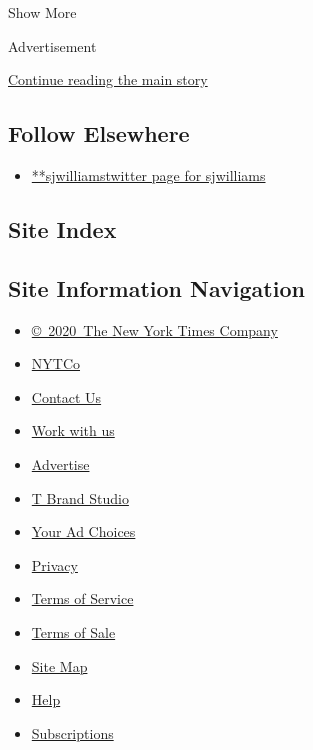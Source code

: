Show More

Advertisement

\protect\hyperlink{after-mid2}{Continue reading the main story}

\hypertarget{follow-elsewhere}{%
\subsection{Follow Elsewhere}\label{follow-elsewhere}}

\begin{itemize}
\tightlist
\item
  \href{https://twitter.com/sjwilliams}{**sjwilliamstwitter page for
  sjwilliams}
\end{itemize}

\hypertarget{site-index}{%
\subsection{Site Index}\label{site-index}}

\hypertarget{site-information-navigation}{%
\subsection{Site Information
Navigation}\label{site-information-navigation}}

\begin{itemize}
\tightlist
\item
  \href{https://help.nytimes.com/hc/en-us/articles/115014792127-Copyright-notice}{©~2020~The
  New York Times Company}
\end{itemize}

\begin{itemize}
\tightlist
\item
  \href{https://www.nytco.com/}{NYTCo}
\item
  \href{https://help.nytimes.com/hc/en-us/articles/115015385887-Contact-Us}{Contact
  Us}
\item
  \href{https://www.nytco.com/careers/}{Work with us}
\item
  \href{https://nytmediakit.com/}{Advertise}
\item
  \href{http://www.tbrandstudio.com/}{T Brand Studio}
\item
  \href{https://www.nytimes.com/privacy/cookie-policy\#how-do-i-manage-trackers}{Your
  Ad Choices}
\item
  \href{https://www.nytimes.com/privacy}{Privacy}
\item
  \href{https://help.nytimes.com/hc/en-us/articles/115014893428-Terms-of-service}{Terms
  of Service}
\item
  \href{https://help.nytimes.com/hc/en-us/articles/115014893968-Terms-of-sale}{Terms
  of Sale}
\item
  \href{https://spiderbites.nytimes.com}{Site Map}
\item
  \href{https://help.nytimes.com/hc/en-us}{Help}
\item
  \href{https://www.nytimes.com/subscription?campaignId=37WXW}{Subscriptions}
\end{itemize}

